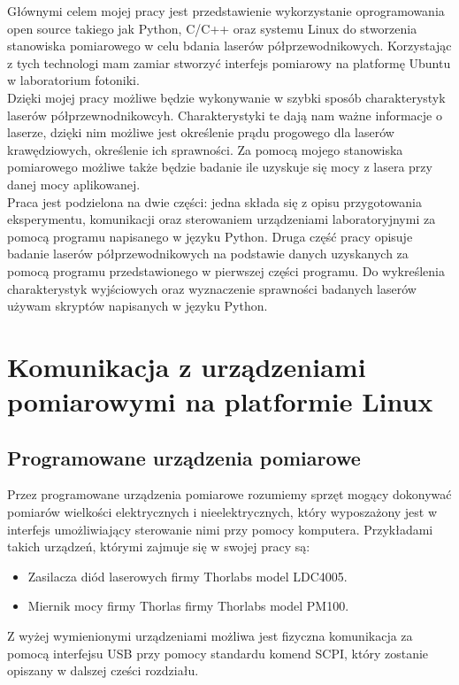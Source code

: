 \documentclass[a4paper, portrait,12pt]{mwrep}
\begin{document}
Głównymi celem mojej pracy jest przedstawienie wykorzystanie oprogramowania
open source takiego jak Python, C/C++ oraz systemu Linux do stworzenia stanowiska pomiarowego w celu bdania laserów półprzewodnikowych. Korzystając z tych technologi mam zamiar stworzyć interfejs pomiarowy na platformę Ubuntu
w laboratorium fotoniki. \\
Dzięki mojej pracy możliwe będzie wykonywanie w szybki sposób charakterystyk laserów półprzewnodnikowcyh. Charakterystyki te dają nam ważne informacje o laserze, dzięki nim możliwe jest określenie prądu progowego dla laserów krawędziowych, określenie ich sprawności. Za pomocą mojego stanowiska pomiarowego możliwe także będzie badanie ile uzyskuje się mocy z lasera przy danej mocy aplikowanej. \\
Praca jest podzielona na dwie części: jedna składa się z opisu przygotowania eksperymentu, komunikacji oraz sterowaniem urządzeniami laboratoryjnymi za pomocą programu napisanego w języku Python. Druga część pracy opisuje badanie laserów półprzewodnikowych na podstawie danych uzyskanych za pomocą programu przedstawionego w pierwszej części programu. Do wykreślenia charakterystyk wyjściowych oraz wyznaczenie sprawności badanych laserów używam skryptów napisanych w języku Python.



\chapter{Komunikacja z urządzeniami pomiarowymi na platformie Linux}
\section{Programowane urządzenia pomiarowe}
Przez  programowane urządzenia pomiarowe rozumiemy sprzęt mogący dokonywać pomiarów wielkości elektrycznych i nieelektrycznych, który wyposzażony jest w interfejs umożliwiający sterowanie nimi przy pomocy komputera. Przykładami takich urządzeń, którymi zajmuje się w swojej pracy są:
\begin{itemize}
\item Zasilacza diód laserowych firmy Thorlabs model LDC4005.
\item Miernik mocy firmy Thorlas firmy Thorlabs model PM100.
\end{itemize}
Z wyżej wymienionymi urządzeniami możliwa jest fizyczna komunikacja za pomocą interfejsu USB przy pomocy standardu komend SCPI, który zostanie opiszany w dalszej cześci rozdziału.
\end{document}
